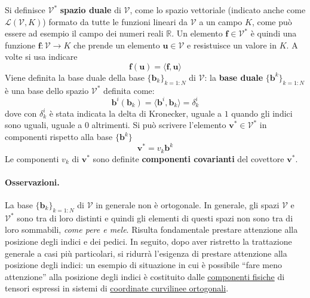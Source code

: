  Si definisce $\mathcal{V}^*$ \textbf{spazio duale} di $\mathcal{V}$, come lo spazio vettoriale
 (indicato anche come $\mathscr{L}(\mathcal{V},K)$)
 formato da tutte le funzioni lineari da $\mathcal{V}$ a un campo $K$, come può essere
 ad esempio il campo dei numeri reali $\mathbb{R}$.
 Un elemento $\bm{f} \in \mathcal{V}^*$ è quindi una funzione $\bm{f}: \mathcal{V} \rightarrow K $ che
 prende un elemento $\bm{u} \in \mathcal{V}$ e resistuisce un valore in $K$. A volte si usa indicare
\begin{equation}
  \bm{f}(\bm{u}) = \langle \bm{f} , \bm{u} \rangle
\end{equation}
 Viene definita la base duale della base $\{ \bm{b}_k \}_{k=1:N}$ di $\mathcal{V}$: la
 \textbf{base duale} $\{ \bm{b}^k \}_{k=1:N}$ è una base dello spazio $\mathcal{V}^*$ definita come:
\begin{equation}
  \bm{b}^i (\bm{b}_k) = \langle \bm{b}^i , \bm{b}_k \rangle = \delta_k^i
\end{equation}
 dove con $\delta_k^i$ è stata indicata la delta di Kronecker, uguale a $1$ quando gli indici sono
 uguali, uguale a $0$ altrimenti.
 Si può scrivere l'elemento $\bm{v}^* \in \mathcal{V}^*$ in componenti rispetto alla base $\{ \bm{b}^k \}$
\begin{equation}
  \bm{v}^* = v_k \bm{b}^k
\end{equation}
 Le componenti $v_k$ di $\bm{v}^*$ sono definite \textbf{componenti covarianti} del covettore $\bm{v}^*$.
 
 \paragraph{Osservazioni.} 
 La base $\{ \bm{b}_k \}_{k=1:N}$ di $\mathcal{V}$ in generale non è ortogonale. 
  In generale, gli spazi $\mathcal{V}$ e $\mathcal{V}^*$ sono tra di
 loro distinti e quindi gli elementi di questi spazi non sono tra di loro sommabili, 
 \textit{come pere e mele}. 
  Risulta fondamentale prestare attenzione alla posizione degli indici e dei pedici.
  In seguito, dopo aver ristretto la trattazione generale a casi più particolari, si ridurrà l'esigenza di prestare attenzione 
  alla posizione degli indici: un esempio di situazione in cui è possibile ``fare meno attenzione'' alla posizione
  degli indici è costituito dalle \underline{componenti fisiche} di tensori espressi in sistemi di \underline{coordinate 
  curvilinee ortogonali}.
  
